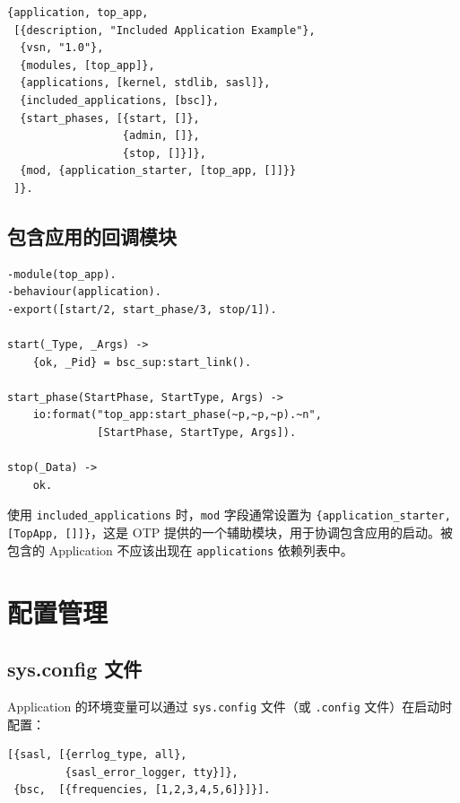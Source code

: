 \documentclass[a4paper,11pt]{article}
\begin{document}
\begin{lstlisting}[style=erlangstyle, caption={top\_app.app --- 包含 bsc 的 Application}]
{application, top_app,
 [{description, "Included Application Example"},
  {vsn, "1.0"},
  {modules, [top_app]},
  {applications, [kernel, stdlib, sasl]},
  {included_applications, [bsc]},
  {start_phases, [{start, []},
                  {admin, []},
                  {stop, []}]},
  {mod, {application_starter, [top_app, []]}}
 ]}.
\end{lstlisting}

\subsection{包含应用的回调模块}

\begin{lstlisting}[style=erlangstyle, caption={top\_app.erl --- 包含应用的回调模块}]
-module(top_app).
-behaviour(application).
-export([start/2, start_phase/3, stop/1]).

start(_Type, _Args) ->
    {ok, _Pid} = bsc_sup:start_link().

start_phase(StartPhase, StartType, Args) ->
    io:format("top_app:start_phase(~p,~p,~p).~n",
              [StartPhase, StartType, Args]).

stop(_Data) ->
    ok.
\end{lstlisting}

\begin{warnbox}[注意]
使用 \texttt{included\_applications} 时，\texttt{mod} 字段通常设置为 \texttt{\{application\_starter, [TopApp, []]\}}，这是 OTP 提供的一个辅助模块，用于协调包含应用的启动。被包含的 Application 不应该出现在 \texttt{applications} 依赖列表中。
\end{warnbox}


\section{配置管理}

\subsection{sys.config 文件}

Application 的环境变量可以通过 \texttt{sys.config} 文件（或 \texttt{.config} 文件）在启动时配置：

\begin{lstlisting}[style=erlangstyle, caption={bsc.config --- 系统配置文件}]
[{sasl, [{errlog_type, all},
         {sasl_error_logger, tty}]},
 {bsc,  [{frequencies, [1,2,3,4,5,6]}]}].
\end{lstlisting}
\end{document}
